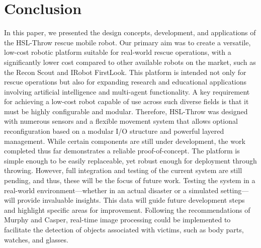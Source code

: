 \documentclass[conference]{IEEEtran}
\begin{document}
\section{Conclusion}
In this paper, we presented the design concepts, development, and applications of the HSL-Throw rescue mobile robot. Our primary aim was to create a versatile, low-cost robotic platform suitable for real-world rescue operations, with a significantly lower cost compared to other available robots on the market, such as the Recon Scout and IRobot FirstLook. This platform is intended not only for rescue operations but also for expanding research and educational applications involving artificial intelligence and multi-agent functionality. A key requirement for achieving a low-cost robot capable of use across such diverse fields is that it must be highly configurable and modular. Therefore, HSL-Throw was designed with numerous sensors and a flexible movement system that allows optional reconfiguration based on a modular I/O structure and powerful layered management. While certain components are still under development, the work completed thus far demonstrates a reliable proof-of-concept. The platform is simple enough to be easily replaceable, yet robust enough for deployment through throwing. However, full integration and testing of the current system are still pending, and thus, these will be the focus of future work. Testing the system in a real-world environment—whether in an actual disaster or a simulated setting—will provide invaluable insights. This data will guide future development steps and highlight specific areas for improvement. Following the recommendations of Murphy and Casper, real-time image processing could be implemented to facilitate the detection of objects associated with victims, such as body parts, watches, and glasses.



\end{document}
